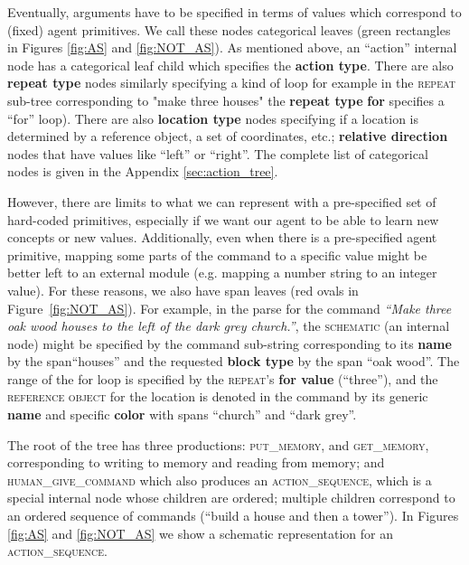 \smallskip

 Eventually, arguments have to be specified in terms of values which correspond to (fixed) agent primitives. We call these nodes categorical leaves (green rectangles in Figures \ref{fig:AS} and \ref{fig:NOT_AS}).  As mentioned above, an ``action'' internal node has a categorical leaf child which specifies the \textbf{action type}. There are also \textbf{repeat type} nodes similarly specifying a kind of loop  for example in  the \textsc{repeat} sub-tree corresponding to "make three houses" the \textbf{repeat type} \textbf{for} specifies a ``for'' loop).   There are also \textbf{location type} nodes specifying if a location is determined by a reference object, a set of coordinates, etc.;  \textbf{relative direction} nodes that have values like ``left'' or ``right''. The complete list of categorical nodes is given in the Appendix \ref{sec:action_tree}.

However, there are limits to what we can represent with a pre-specified set of hard-coded primitives, especially if we want our agent to be able to learn new concepts or new values. Additionally, even when there is a pre-specified agent primitive, mapping some parts of the command to a specific value might be better left to an external module (e.g. mapping a number string to an integer value). For these reasons, we also have span leaves (red ovals in Figure~\ref{fig:NOT_AS}). %
For example, in the parse for the command  \textit{``Make three oak wood houses to the left of the dark grey church.''}, %
the \textsc{schematic} (an internal node) might be specified by the command sub-string corresponding to its \textbf{name} by the span``houses''  and the requested \textbf{block type} by the span ``oak wood''. The range of the for loop is specified by the \textsc{repeat}'s \textbf{for value} (``three''), and the \textsc{reference object} for the location is denoted in the command by its generic \textbf{name} and specific \textbf{color} with spans ``church'' and ``dark grey''.

 \smallskip

 The root of the tree has three productions:   \textsc{put\_memory}, and \textsc{get\_memory}, corresponding to writing to memory and reading from memory; and \textsc{human\_give\_command} which also produces an \textsc{action\_sequence}, which is a special internal node whose children are ordered; multiple children correspond to an ordered  sequence of commands (``build a house and then a tower'').  In Figures \ref{fig:AS} and \ref{fig:NOT_AS} we show a schematic representation for an \textsc{action\_sequence}.